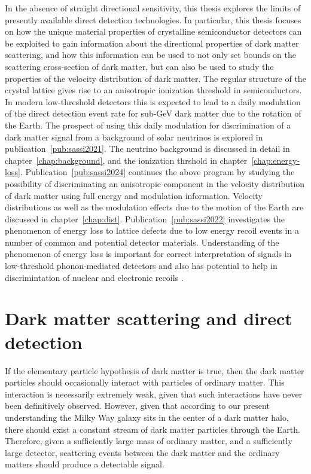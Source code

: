 \documentclass[b5paper, 10pt, twoside]{book}
\begin{document}
In the absence of straight directional sensitivity, this thesis explores the limits of presently available direct detection technologies. In particular, this thesis focuses on how the unique material properties of crystalline semiconductor detectors can be exploited to gain information about the directional properties of dark matter scattering, and how this information can be used to not only set bounds on the scattering cross-section of dark matter, but can also be used to study the properties of the velocity distribution of dark matter. The regular structure of the crystal lattice gives rise to an anisotropic ionization threshold in semiconductors. In modern low-threshold detectors this is expected to lead to a daily modulation of the direct detection event rate for sub-GeV dark matter due to the rotation of the Earth. The prospect of using this daily modulation for discrimination of a dark matter signal from a background of solar neutrinos is explored in publication~\ref{pub:sassi2021}. The neutrino background is discussed in detail in chapter~\ref{chap:background}, and the ionization thrshold in chapter~\ref{chap:energy-loss}. Publication~\ref{pub:sassi2024} continues the above program by studying the possibility of discriminating an anisotropic component in the velocity distribution of dark matter using full energy and modulation information. Velocity distributions as well as the modulation effects due to the motion of the Earth are discussed in chapter~\ref{chap:dist}. Publication~\ref{pub:sassi2022} investigates the phenomenon of energy loss to lattice defects due to low energy recoil events in a number of common and potential detector materials. Understanding of the phenomenon of energy loss is important for correct interpretation of signals in low-threshold phonon-mediated detectors and also has potential to help in discrimintation of nuclear and electronic recoils \parencite{HeikinheimoEtAl2022}.

\chapter{Dark matter scattering and direct detection}
\label{chap:direct-detection}

If the elementary particle hypothesis of dark matter is true, then the dark matter particles should occasionally interact with particles of ordinary matter. This interaction is necessarily extremely weak, given that such interactions have never been definitively observed. However, given that according to our present understanding the Milky Way galaxy sits in the center of a dark matter halo, there should exist a constant stream of dark matter particles through the Earth. Therefore, given a sufficiently large mass of ordinary matter, and a sufficiently large detector, scattering events between the dark matter and the ordinary matters should produce a detectable signal.
\end{document}
